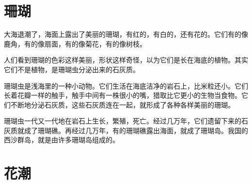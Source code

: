 \documentclass[12pt,UTF-8,openany]{ctexbook}
\begin{document}
\chapter{珊瑚}

\begin{large}
    
    大海退潮了，海面上露出了美丽的珊瑚，有红的，有白的，还有花的。它们有的像鹿角，有的像扇面，有的像菊花，有的像树枝。
    
    人们看到珊瑚的色彩这样美丽，形状这样奇怪，以为它们是长在海底的植物。其实它们不是植物，是珊瑚虫分泌出来的石灰质。
    
    珊瑚虫是浅海里的一种小动物。它们生活在海底洁净的岩石上，比米粒还小。它们长着花瓣一样的触手，触手中间有一株很小的嘴，猎取比它更小的生物当食物。它们不断地分泌石灰质，这些石灰质连在一起，就形成了各种各样美丽的珊瑚。
    
    珊瑚虫一代又一代地在岩石上生长，繁殖，死亡。经过几万年，它们遗留下来的石灰质就成了珊瑚礁。再经过几万年，有的珊瑚礁露出海面，就成了珊瑚岛。我国的西沙群岛，就是由许多珊瑚岛组成的。
    
\end{large}



\chapter{花潮}
\end{document}
